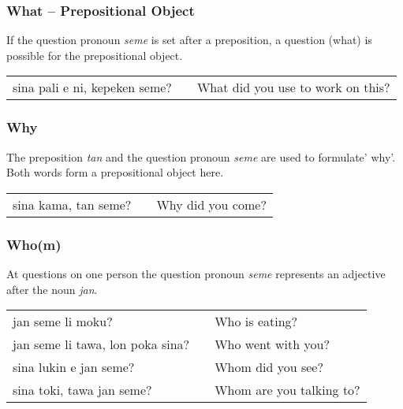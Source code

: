 \subsubsection*{What -- Prepositional Object}

%
If the question pronoun \textit{seme} is set after a preposition, a question (what) is possible for the prepositional object. \\

\begin{supertabular}{p{5,5cm}|ll}
sina pali e ni, kepeken seme? &&  What did you use to work on this? \\
\end{supertabular} 

\subsubsection*{Why}
%
%
The preposition \textit{tan} and the question pronoun \textit{seme} are used to formulate' why'. 
Both words form a prepositional object here.

\begin{supertabular}{p{5,5cm}|ll}
sina kama, tan seme? && Why did you come? \\
\end{supertabular} 

\subsubsection*{Who(m)}
%
%
At questions on one person the question pronoun \textit{seme} represents an adjective after the noun \textit{jan}. 

\begin{supertabular}{p{5,5cm}|ll}
jan seme li moku? && Who is eating? \\
jan seme li tawa, lon poka sina? && Who went with you? \\
sina lukin e jan seme? && Whom did you see? \\
sina toki, tawa jan seme? && Whom are you talking to? \\
\end{supertabular} 
%
